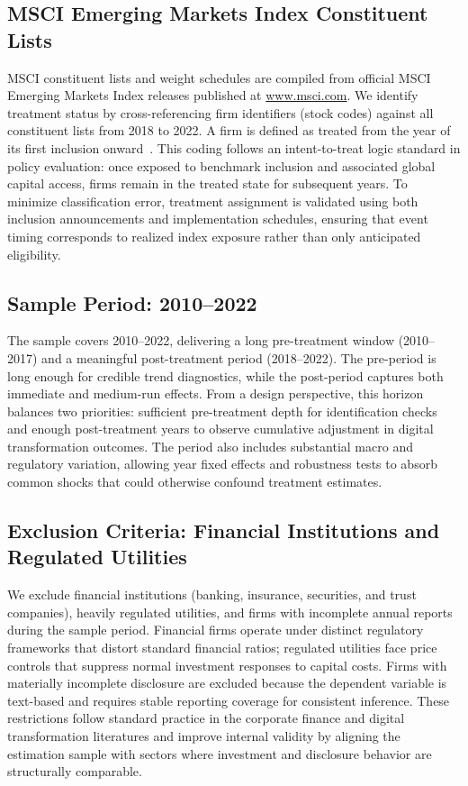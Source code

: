 \subsection{MSCI Emerging Markets Index Constituent Lists}

MSCI constituent lists and weight schedules are compiled from official MSCI Emerging Markets Index releases published at \url{www.msci.com}. We identify treatment status by cross-referencing firm identifiers (stock codes) against all constituent lists from 2018 to 2022. A firm is defined as treated from the year of its first inclusion onward~\cite{Descy2024}. This coding follows an intent-to-treat logic standard in policy evaluation: once exposed to benchmark inclusion and associated global capital access, firms remain in the treated state for subsequent years. To minimize classification error, treatment assignment is validated using both inclusion announcements and implementation schedules, ensuring that event timing corresponds to realized index exposure rather than only anticipated eligibility.

\subsection{Sample Period: 2010--2022}

The sample covers 2010--2022, delivering a long pre-treatment window (2010--2017) and a meaningful post-treatment period (2018--2022). The pre-period is long enough for credible trend diagnostics, while the post-period captures both immediate and medium-run effects. From a design perspective, this horizon balances two priorities: sufficient pre-treatment depth for identification checks and enough post-treatment years to observe cumulative adjustment in digital transformation outcomes. The period also includes substantial macro and regulatory variation, allowing year fixed effects and robustness tests to absorb common shocks that could otherwise confound treatment estimates.

\subsection{Exclusion Criteria: Financial Institutions and Regulated Utilities}

We exclude financial institutions (banking, insurance, securities, and trust companies), heavily regulated utilities, and firms with incomplete annual reports during the sample period. Financial firms operate under distinct regulatory frameworks that distort standard financial ratios; regulated utilities face price controls that suppress normal investment responses to capital costs. Firms with materially incomplete disclosure are excluded because the dependent variable is text-based and requires stable reporting coverage for consistent inference. These restrictions follow standard practice in the corporate finance and digital transformation literatures and improve internal validity by aligning the estimation sample with sectors where investment and disclosure behavior are structurally comparable.

